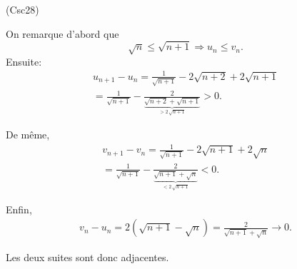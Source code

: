 \begin{tiny}(Csc28)\end{tiny}
On remarque d'abord que 
\[
 \sqrt{n} \leq \sqrt{n+1} \Rightarrow u_n \leq v_n.
\]
Ensuite:
\begin{multline*}
 u_{n+1} - u_n
 = \frac{1}{\sqrt{n+1}} -2\sqrt{n+2} + 2\sqrt{n+1}\\
 = \frac{1}{\sqrt{n+1}} - \frac{2}{\underset{> 2\, \sqrt{n+1}}{\underbrace{\sqrt{n+2} + \sqrt{n+1}}}}
 > 0 .
\end{multline*}

De même,
\begin{multline*}
 v_{n+1} - v_n
 = \frac{1}{\sqrt{n+1}} -2\sqrt{n+1} + 2\sqrt{n}\\
 = \frac{1}{\sqrt{n+1}} - \frac{2}{\underset{< 2\, \sqrt{n+1}}{\underbrace{\sqrt{n+1} + \sqrt{n}}}}
 < 0 .
\end{multline*}

Enfin,
\begin{multline*}
 v_n - u_n = 2\left( \sqrt{n+1} - \sqrt{n}\right)
 = \frac{2}{\sqrt{n+1} + \sqrt{n}} \rightarrow 0.
\end{multline*}

Les deux suites sont donc adjacentes.
